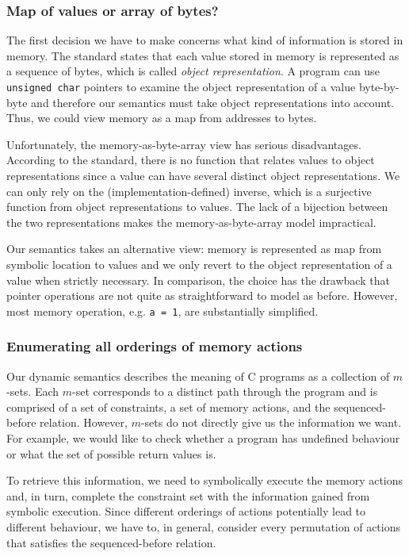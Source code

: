 \documentclass[a4paper,12pt]{scrbook}
\theoremstyle{plain}
\theoremstyle{definition}
\begin{document}
\subsubsection{Map of values or array of bytes?}
The first decision we have to make concerns what kind of information is stored
in memory. The standard states that each value stored in memory is represented
as a sequence of bytes, which is called \textit{object representation}. A
program can use \lstinline{unsigned char} pointers to examine the object
representation of a value byte-by-byte and therefore our semantics must take
object representations into account. Thus, we could view memory as a map from
addresses to bytes.

Unfortunately, the memory-as-byte-array view has serious
disadvantages. According to the standard, there is no function that relates
values to object representations since a value can have several distinct object
representations. We can only rely on the (implementation-defined) inverse, which
is a surjective function from object representations to values. The lack of a
bijection between the two representations makes the memory-as-byte-array model
impractical.

Our semantics takes an alternative view: memory is represented as map from
symbolic location to values and we only revert to the object representation of a
value when strictly necessary. In comparison, the choice has the drawback that
pointer operations are not quite as straightforward to model as before. However,
most memory operation, e.g. \lstinline{a = 1}, are substantially simplified.

\subsubsection{Enumerating all orderings of memory actions}
Our dynamic semantics describes the meaning of C programs as a collection of
$m$-sets. Each $m$-set corresponds to a distinct path through the program and is
comprised of a set of constraints, a set of memory actions, and the
sequenced-before relation. However, $m$-sets do not directly give us the
information we want. For example, we would like to check whether a program has
undefined behaviour or what the set of possible return values is.

To retrieve this information, we need to symbolically execute the memory actions
and, in turn, complete the constraint set with the information gained from
symbolic execution. Since different orderings of actions potentially lead to
different behaviour, we have to, in general, consider every permutation of
actions that satisfies the sequenced-before relation.
\end{document}
